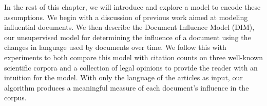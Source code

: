 
In the rest of this chapter, we will introduce and explore a model to
encode these assumptions.  We begin with a discussion of previous work
aimed at modeling influential documents.  We then describe the
Document Influence Model (DIM), our unsupervised model for determining
the influence of a document using the changes in language used by
documents over time.  We follow this with experiments to both compare
this model with citation counts on three well-known scientific corpora
and a collection of legal opinions to provide the reader with an
intuition for the model. With only the language of the
articles as input, our algorithm produces a meaningful measure of each
document's influence in the corpus.
